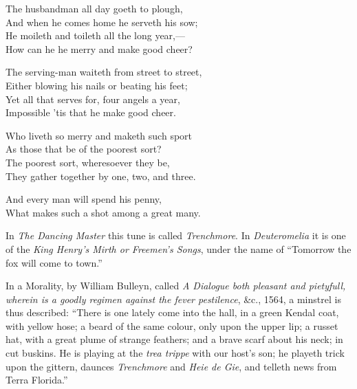 \begin{scverse}
The husbandman all day goeth to plough,\\
And when he comes home he serveth his sow;\\
He moileth and toileth all the long year,—\\
How can he he merry and make good cheer?

The serving-man waiteth from street to street,\\
Either blowing his nails or beating his feet;\\
Yet all that serves for, four angels a year,\\
Impossible ’tis that he make good cheer.


Who liveth so merry and maketh such sport\\
As those that be of the poorest sort?\\
The poorest sort, wheresoever they be,\\
They gather together by one, two, and three.

And every man will spend his penny,\\
What makes such a shot among a great many.
\end{scverse}




In \textit{The Dancing Master} this tune is called \textit{Trenchmore}. In \textit{Deuteromelia} it is
one of the \textit{King Henry’s Mirth or Freemen’s Songs}, under the name of “Tomorrow
the fox will come to town.”

In a Morality, by William Bulleyn, called \textit{A Dialogue both pleasant and pietyfull,
wherein is a goodly regimen against the fever pestilence}, \&c., 1564, a minstrel
is thus described: “There is one lately come into the hall, in a green Kendal coat,
with yellow hose; a beard of the same colour, only upon the upper lip; a russet
hat, with a great plume of strange feathers; and a brave scarf about his neck;
in cut buskins. He is playing at the \textit{trea trippe} with our host’s son; he playeth
trick upon the gittern, daunces \textit{Trenchmore} and \textit{Heie de Gie}, and telleth news
from Terra Florida.”

